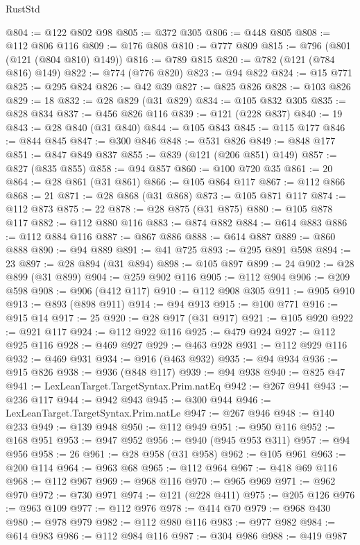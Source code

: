 \begin{lexlean}{RustStd}
\begin{coremodule}
@804 := @122 @802 @98
@805 := @372 @305
@806 := @448 @805
@808 := @112 @806 @116
@809 := @176 @808
@810 := @777 @809
@815 := @796 (@801 (@121 (@804 @810) @149))
@816 := @789 @815
@820 := @782 (@121 (@784 @816) @149)
@822 := @774 (@776 @820)
@823 := @94 @822
@824 := @15 @771
@825 := @295 @824
@826 := @42 @39
@827 := @825 @826
@828 := @103 @826
@829 := 18
@832 := @28 @829 (@31 @829)
@834 := @105 @832 @305
@835 := @828 @834
@837 := @456 @826 @116
@839 := @121 (@228 @837)
@840 := 19
@843 := @28 @840 (@31 @840)
@844 := @105 @843
@845 := @115 @177
@846 := @844 @845
@847 := @300 @846
@848 := @531 @826
@849 := @848 @177
@851 := @847 @849 @837
@855 := @839 (@121 (@206 @851) @149)
@857 := @827 (@835 @855)
@858 := @94 @857
@860 := @100 @720 @35
@861 := 20
@864 := @28 @861 (@31 @861)
@866 := @105 @864 @117
@867 := @112 @866
@868 := 21
@871 := @28 @868 (@31 @868)
@873 := @105 @871 @117
@874 := @112 @873
@875 := 22
@878 := @28 @875 (@31 @875)
@880 := @105 @878 @117
@882 := @112 @880 @116
@883 := @874 @882
@884 := @614 @883
@886 := @112 @884 @116
@887 := @867 @886
@888 := @614 @887
@889 := @860 @888
@890 := @94 @889
@891 := @41 @725
@893 := @295 @891 @598
@894 := 23
@897 := @28 @894 (@31 @894)
@898 := @105 @897
@899 := 24
@902 := @28 @899 (@31 @899)
@904 := @259 @902 @116
@905 := @112 @904
@906 := @209 @598
@908 := @906 (@412 @117)
@910 := @112 @908 @305
@911 := @905 @910
@913 := @893 (@898 @911)
@914 := @94 @913
@915 := @100 @771
@916 := @915 @14
@917 := 25
@920 := @28 @917 (@31 @917)
@921 := @105 @920
@922 := @921 @117
@924 := @112 @922 @116
@925 := @479 @924
@927 := @112 @925 @116
@928 := @469 @927
@929 := @463 @928
@931 := @112 @929 @116
@932 := @469 @931
@934 := @916 (@463 @932)
@935 := @94 @934
@936 := @915 @826
@938 := @936 (@848 @117)
@939 := @94 @938
@940 := @825 @47
@941 := LexLeanTarget.TargetSyntax.Prim.natEq
@942 := @267 @941
@943 := @236 @117
@944 := @942 @943
@945 := @300 @944
@946 := LexLeanTarget.TargetSyntax.Prim.natLe
@947 := @267 @946
@948 := @140 @233
@949 := @139 @948
@950 := @112 @949
@951 := @950 @116
@952 := @168 @951
@953 := @947 @952
@956 := @940 (@945 @953 @311)
@957 := @94 @956
@958 := 26
@961 := @28 @958 (@31 @958)
@962 := @105 @961
@963 := @200 @114
@964 := @963 @68
@965 := @112 @964
@967 := @418 @69 @116
@968 := @112 @967
@969 := @968 @116
@970 := @965 @969
@971 := @962 @970
@972 := @730 @971
@974 := @121 (@228 @411)
@975 := @205 @126
@976 := @963 @109
@977 := @112 @976
@978 := @414 @70
@979 := @968 @430
@980 := @978 @979
@982 := @112 @980 @116
@983 := @977 @982
@984 := @614 @983
@986 := @112 @984 @116
@987 := @304 @986
@988 := @419 @987

\end{coremodule}
\end{lexlean}

